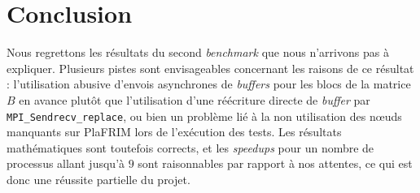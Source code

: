 \section*{Conclusion}

Nous regrettons les résultats du second \emph{benchmark} que nous n'arrivons pas à expliquer. Plusieurs pistes sont envisageables concernant les raisons de ce résultat : l'utilisation abusive d'envois asynchrones de \emph{buffers} pour les blocs de la matrice $B$ en avance plutôt que l'utilisation d'une réécriture directe de \emph{buffer} par \verb!MPI_Sendrecv_replace!, ou bien un problème lié à la non utilisation des n\oe uds manquants sur PlaFRIM lors de l'exécution des tests. Les résultats mathématiques sont toutefois corrects, et les \emph{speedups} pour un nombre de processus allant jusqu'à $9$ sont raisonnables par rapport à nos attentes, ce qui est donc une réussite partielle du projet.
